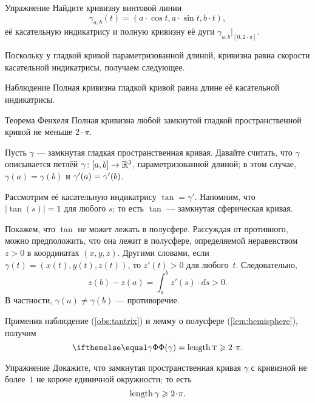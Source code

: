\begin{thm}{Упражнение}\label{ex:helix-curvature}
Найдите кривизну винтовой линии 
\[\gamma_{a,b}(t)=(a\cdot \cos t,a\cdot \sin t,b\cdot t),\]
её касательную индикатрису и полную кривизну её дуги $\gamma_{a,b}|_{[0,2\cdot\pi]}$.
\end{thm}

Поскольку у гладкой кривой параметризованной длиной, кривизна равна скорости касательной индикатрисы,
получаем следующее.

\begin{thm}{Наблюдение}\label{obs:tantrix}
Полная кривизна гладкой кривой равна длине её касательной индикатрисы.
\end{thm}

{\sloppy

\begin{thm}{Теорема Фенхеля}
\label{thm:fenchel}
Полная кривизна любой замкнутой гладкой пространственной кривой не меньше $2\cdot\pi$.
\end{thm}

}

Пусть $\gamma$ --- замкнутая гладкая пространственная кривая.
Давайте считать, что $\gamma$ описывается петлёй $\gamma\:[a,b]\z\to \mathbb{R}^3$, параметризованной длиной;
в этом случае, $\gamma(a)=\gamma(b)$ и $\gamma'(a)\z=\gamma'(b)$.

Рассмотрим её касательную индикатрису $\tan=\gamma'$.
Напомним, что $|\tan(s)|=1$ для любого $s$; то есть $\tan$ --- замкнутая сферическая кривая.

Покажем, что $\tan$ не может лежать в полусфере.
Рассуждая от противного, можно предположить, что она лежит в полусфере, определяемой неравенством $z>0$ в координатах $(x,y,z)$.
Другими словами, если $\gamma(t)=(x(t), y(t), z(t))$, то $z'(t)>0$ для любого~$t$.
Следовательно,
\[z(b)-z(a)=\int_a^b z'(s)\cdot ds>0.\]
В частности, $\gamma(a)\ne \gamma(b)$ --- противоречие.

Применив наблюдение (\ref{obs:tantrix}) и лемму о полусфере (\ref{lem:hemisphere}), получим  
\[\tc\gamma=\length \tan\ge2\cdot\pi.\]
\qedsf


\begin{thm}{Упражнение}\label{ex:length>=2pi}
Докажите, что замкнутая пространственная кривая $\gamma$ с кривизной не более~$1$ не короче единичной окружности;
то есть
\[\length\gamma\ge 2\cdot \pi.\]

\end{thm}

